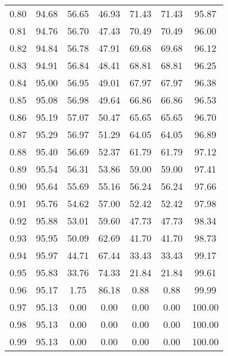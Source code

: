 \begin{tabular}{|c|c|c|c|c|c|c|}
      0.80 &     94.68 &     56.65 &      46.93 &   71.43 &      71.43 &         95.87 \\
      0.81 &     94.76 &     56.70 &      47.43 &   70.49 &      70.49 &         96.00 \\
      0.82 &     94.84 &     56.78 &      47.91 &   69.68 &      69.68 &         96.12 \\
      0.83 &     94.91 &     56.84 &      48.41 &   68.81 &      68.81 &         96.25 \\
      0.84 &     95.00 &     56.95 &      49.01 &   67.97 &      67.97 &         96.38 \\
      0.85 &     95.08 &     56.98 &      49.64 &   66.86 &      66.86 &         96.53 \\
      0.86 &     95.19 &     57.07 &      50.47 &   65.65 &      65.65 &         96.70 \\
      0.87 &     95.29 &     56.97 &      51.29 &   64.05 &      64.05 &         96.89 \\
      0.88 &     95.40 &     56.69 &      52.37 &   61.79 &      61.79 &         97.12 \\
      0.89 &     95.54 &     56.31 &      53.86 &   59.00 &      59.00 &         97.41 \\
      0.90 &     95.64 &     55.69 &      55.16 &   56.24 &      56.24 &         97.66 \\
      0.91 &     95.76 &     54.62 &      57.00 &   52.42 &      52.42 &         97.98 \\
      0.92 &     95.88 &     53.01 &      59.60 &   47.73 &      47.73 &         98.34 \\
      0.93 &     95.95 &     50.09 &      62.69 &   41.70 &      41.70 &         98.73 \\
      0.94 &     95.97 &     44.71 &      67.44 &   33.43 &      33.43 &         99.17 \\
      0.95 &     95.83 &     33.76 &      74.33 &   21.84 &      21.84 &         99.61 \\
      0.96 &     95.17 &      1.75 &      86.18 &    0.88 &       0.88 &         99.99 \\
      0.97 &     95.13 &      0.00 &       0.00 &    0.00 &       0.00 &        100.00 \\
      0.98 &     95.13 &      0.00 &       0.00 &    0.00 &       0.00 &        100.00 \\
      0.99 &     95.13 &      0.00 &       0.00 &    0.00 &       0.00 &        100.00 \\
\bottomrule
\end{tabular}
